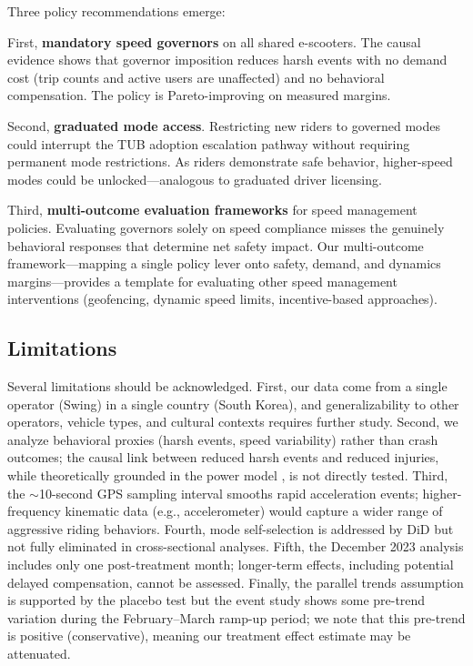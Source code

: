 Three policy recommendations emerge:

First, \textbf{mandatory speed governors} on all shared e-scooters. The causal evidence shows that governor imposition reduces harsh events with no demand cost (trip counts and active users are unaffected) and no behavioral compensation. The policy is Pareto-improving on measured margins.

Second, \textbf{graduated mode access}. Restricting new riders to governed modes could interrupt the TUB adoption escalation pathway without requiring permanent mode restrictions. As riders demonstrate safe behavior, higher-speed modes could be unlocked---analogous to graduated driver licensing.

Third, \textbf{multi-outcome evaluation frameworks} for speed management policies. Evaluating governors solely on speed compliance misses the genuinely behavioral responses that determine net safety impact. Our multi-outcome framework---mapping a single policy lever onto safety, demand, and dynamics margins---provides a template for evaluating other speed management interventions (geofencing, dynamic speed limits, incentive-based approaches).

\subsection{Limitations}
\label{sec:disc_limitations}

Several limitations should be acknowledged. First, our data come from a single operator (Swing) in a single country (South Korea), and generalizability to other operators, vehicle types, and cultural contexts requires further study. Second, we analyze behavioral proxies (harsh events, speed variability) rather than crash outcomes; the causal link between reduced harsh events and reduced injuries, while theoretically grounded in the power model \citep{elvik2013reexamination}, is not directly tested. Third, the $\sim$10-second GPS sampling interval smooths rapid acceleration events; higher-frequency kinematic data (e.g., accelerometer) would capture a wider range of aggressive riding behaviors. Fourth, mode self-selection is addressed by DiD but not fully eliminated in cross-sectional analyses. Fifth, the December 2023 analysis includes only one post-treatment month; longer-term effects, including potential delayed compensation, cannot be assessed. Finally, the parallel trends assumption is supported by the placebo test but the event study shows some pre-trend variation during the February--March ramp-up period; we note that this pre-trend is positive (conservative), meaning our treatment effect estimate may be attenuated.
